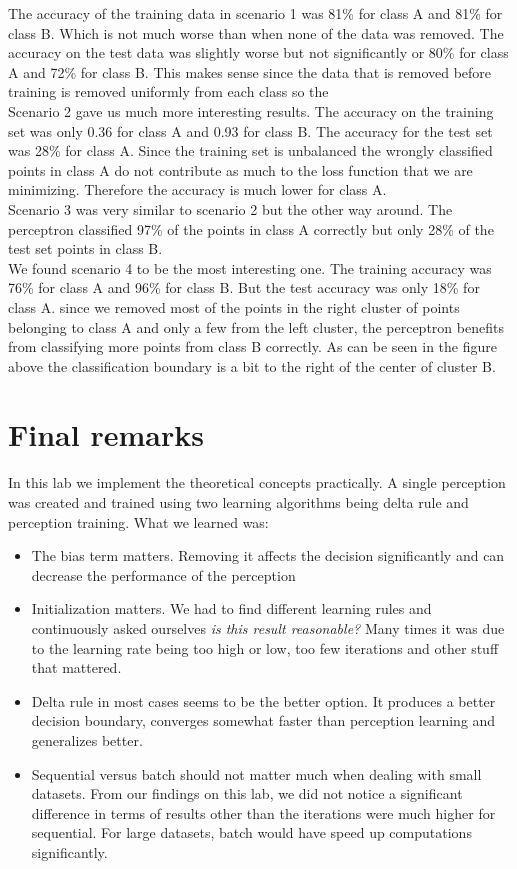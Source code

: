 \documentclass[a4paper]{article}
\begin{document}
The accuracy of the training data in scenario 1 was 81\% for class A and 81\% for class B. Which is not much worse than when none of the data was removed. The accuracy on the test data was slightly worse but not significantly or 80\% for class A and 72\% for class B. This makes sense since the data that is removed before training is removed uniformly from each class so the 
\\
Scenario 2 gave us much more interesting results. The accuracy on the training set was only 0.36 for class A and 0.93 for class B. The accuracy for the test set was 28\% for class A. Since the training set is unbalanced the wrongly classified points in class A do not contribute as much to the loss function that we are minimizing. Therefore the accuracy is much lower for class A.
\\
Scenario 3 was very similar to scenario 2 but the other way around. The perceptron classified 97\% of the points in class A correctly but only 28\% of the test set points in class B.\\
We found scenario 4 to be the most interesting one. The training accuracy was 76\% for class A and 96\% for class B. But the test accuracy was only 18\% for class A. since we removed most of the points in the right cluster of points belonging to class A and only a few from the left cluster, the perceptron benefits from classifying more points from class B correctly. As can be seen in the figure above the classification boundary is a bit to the right of the center of cluster B.

\section{Final remarks} 
In this lab we implement the theoretical concepts practically. A single perception was created and trained using two learning algorithms being delta rule and perception training. What we learned was:
\begin{itemize}
    \item The bias term matters. Removing it affects the decision significantly and can decrease the performance of the perception
    \item Initialization matters. We had to find different learning rules and continuously asked ourselves \textit{is this result reasonable?} Many times it was due to the learning rate being too high or low, too few iterations and other stuff that mattered. 
    \item Delta rule in most cases seems to be the better option. It produces a better decision boundary, converges somewhat faster than perception learning and generalizes better. 
    \item Sequential versus batch should not matter much when dealing with small datasets. From our findings on this lab, we did not notice a significant difference in terms of results other than the iterations were much higher for sequential. For large datasets, batch would have speed up computations significantly. 
\end{itemize}
\end{document}
